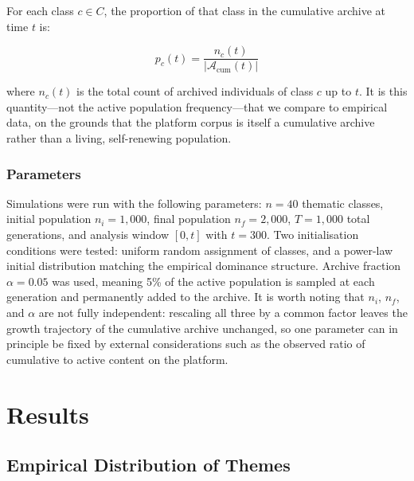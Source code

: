 \documentclass{anthology-ch}         %
\begin{document}
For each class $c \in C$, the proportion of that class in the cumulative archive at time $t$ is:

\begin{equation}
p_c(t) = \frac{n_c(t)}{\left|\mathcal{A}_{\mathrm{cum}}(t)\right|}
\end{equation}

where $n_c(t)$ is the total count of archived individuals of class $c$ up to $t$. It is this quantity---not the active population frequency---that we compare to empirical data, on the grounds that the platform corpus is itself a cumulative archive rather than a living, self-renewing population.

\subsubsection{Parameters}

Simulations were run with the following parameters: $n = 40$ thematic classes, initial population $n_i = 1{,}000$, final population $n_f = 2{,}000$, $T = 1{,}000$ total generations, and analysis window $[0, t]$ with $t = 300$. Two initialisation conditions were tested: uniform random assignment of classes, and a power-law initial distribution matching the empirical dominance structure. Archive fraction $\alpha = 0.05$ was used, meaning 5\% of the active population is sampled at each generation and permanently added to the archive. It is worth noting that $n_i$, $n_f$, and $\alpha$ are not fully independent: rescaling all three by a common factor leaves the growth trajectory of the cumulative archive unchanged, so one parameter can in principle be fixed by external considerations such as the observed ratio of cumulative to active content on the platform.


\section{Results}

\subsection{Empirical Distribution of Themes}
\end{document}
